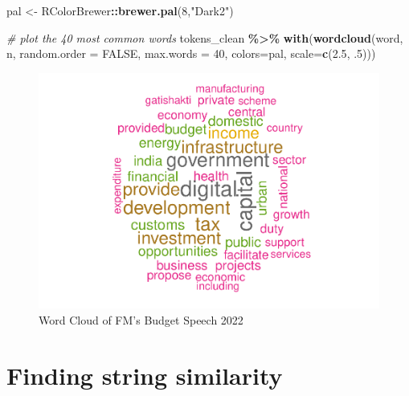\documentclass[
]{book}
\newenvironment{Shaded}{\begin{snugshade}}{\end{snugshade}}
\newcommand{\AttributeTok}[1]{\textcolor[rgb]{0.13,0.29,0.53}{#1}}
\newcommand{\CommentTok}[1]{\textcolor[rgb]{0.56,0.35,0.01}{\textit{#1}}}
\newcommand{\ConstantTok}[1]{\textcolor[rgb]{0.56,0.35,0.01}{#1}}
\newcommand{\DecValTok}[1]{\textcolor[rgb]{0.00,0.00,0.81}{#1}}
\newcommand{\FloatTok}[1]{\textcolor[rgb]{0.00,0.00,0.81}{#1}}
\newcommand{\FunctionTok}[1]{\textcolor[rgb]{0.13,0.29,0.53}{\textbf{#1}}}
\newcommand{\NormalTok}[1]{#1}
\newcommand{\OtherTok}[1]{\textcolor[rgb]{0.56,0.35,0.01}{#1}}
\newcommand{\SpecialCharTok}[1]{\textcolor[rgb]{0.81,0.36,0.00}{\textbf{#1}}}
\newcommand{\StringTok}[1]{\textcolor[rgb]{0.31,0.60,0.02}{#1}}
\begin{document}
\begin{Shaded}
\begin{Highlighting}[]
\NormalTok{pal }\OtherTok{\textless{}{-}}\NormalTok{ RColorBrewer}\SpecialCharTok{::}\FunctionTok{brewer.pal}\NormalTok{(}\DecValTok{8}\NormalTok{,}\StringTok{"Dark2"}\NormalTok{)}

\CommentTok{\# plot the 40 most common words}
\NormalTok{tokens\_clean }\SpecialCharTok{\%\textgreater{}\%} 
  \FunctionTok{with}\NormalTok{(}\FunctionTok{wordcloud}\NormalTok{(word, }
\NormalTok{                 n, }
                 \AttributeTok{random.order =} \ConstantTok{FALSE}\NormalTok{, }
                 \AttributeTok{max.words =} \DecValTok{40}\NormalTok{, }
                 \AttributeTok{colors=}\NormalTok{pal,}
                 \AttributeTok{scale=}\FunctionTok{c}\NormalTok{(}\FloatTok{2.5}\NormalTok{, .}\DecValTok{5}\NormalTok{)))}
\end{Highlighting}
\end{Shaded}

\begin{figure}

{\centering \includegraphics{DauR_files/figure-latex/wordcloud-1} 

}

\caption{Word Cloud of FM's Budget Speech 2022}\label{fig:wordcloud}
\end{figure}

\hypertarget{finding-string-similarity}{%
\chapter{Finding string similarity}\label{finding-string-similarity}}
\end{document}

